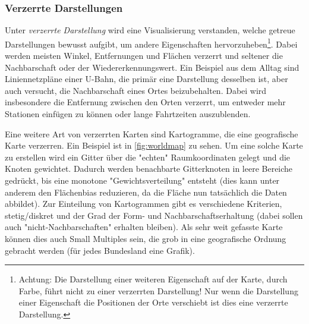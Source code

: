			\subsubsection{Verzerrte Darstellungen}
				Unter \emph{verzerrte Darstellung} wird eine Visualisierung verstanden, welche getreue Darstellungen bewusst aufgibt, um andere Eigenschaften hervorzuheben\footnote{Achtung: Die Darstellung einer weiteren Eigenschaft auf der Karte, \zB durch Farbe, führt nicht zu einer verzerrten Darstellung! Nur wenn die Darstellung einer Eigenschaft die Positionen der Orte verschiebt ist dies eine verzerrte Darstellung.}. Dabei werden meisten Winkel, Entfernungen und Flächen verzerrt und seltener die Nachbarschaft oder der Wiedererkennungswert. Ein Beispiel aus dem Alltag sind Liniennetzpläne einer U-Bahn, die primär eine Darstellung desselben ist, aber auch versucht, die Nachbarschaft eines Ortes beizubehalten. Dabei wird insbesondere die Entfernung zwischen den Orten verzerrt, um entweder mehr Stationen einfügen zu können oder lange Fahrtzeiten auszublenden.

				Eine weitere Art von verzerrten Karten sind Kartogramme, die eine geografische Karte verzerren. Ein Beispiel ist in \autoref{fig:worldmap} zu sehen. Um eine solche Karte zu erstellen wird ein Gitter über die "echten" Raumkoordinaten gelegt und die Knoten gewichtet. Dadurch werden benachbarte Gitterknoten in leere Bereiche gedrückt, bis eine monotone "Gewichtsverteilung" entsteht (dies kann unter anderem den Flächenbias reduzieren, da die Fläche nun tatsächlich die Daten abbildet). Zur Einteilung von Kartogrammen gibt es verschiedene Kriterien, \zB stetig/diskret und der Grad der Form- und Nachbarschaftserhaltung (dabei sollen auch "nicht-Nachbarschaften" erhalten bleiben). Als sehr weit gefasste Karte können dies auch Small Multiples sein, die grob in eine geografische Ordnung gebracht werden (\zB für jedes Bundesland eine Grafik).

